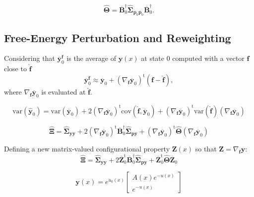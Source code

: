 \documentclass[aip,jcp,reprint,amsmath,amssymb]{revtex4-1}
\newcommand{\mt}[1]{\boldsymbol{\mathbf{#1}}}           %
\newcommand{\vt}[1]{\boldsymbol{\mathbf{#1}}}           %
\newcommand{\tr}[1]{#1^\text{t}}                        %
\begin{document}
\begin{equation}
\hat{\mt \Theta} = \overline{\mt B}_0^\dag \hat{\mt \Sigma}_{\overline{\vt p}_0 \overline{\vt p}_0} \overline{\mt B}_0^\dag.
\end{equation}

\subsection{Free-Energy Perturbation and Reweighting}

Considering that $\overline{\vt y}^{\vt f}_0$ is the average of $\vt y(x)$ at state $0$ computed with a vector $\vt f$ close to $\hat{\vt f}$
\begin{equation*}
\overline{\vt y}^{\vt f}_0 \approx \overline{\vt y}_0 + \tr{(\nabla_{\vt f}\overline{\vt y}_0)}({\vt f} - \hat{\vt f}),
\end{equation*}
where $\nabla_{\vt f}\overline{\vt y}_0$ is evaluated at $\hat{\vt f}$.

\begin{equation}
\text{var}(\hat{\vt y}_0) = \text{var}(\overline{\vt y}_0) + 2\tr{(\nabla_{\vt f}\overline{\vt y}_0)}\text{cov}(\hat{\vt f},\overline{\vt y}_0) + \tr{(\nabla_{\vt f}\overline{\vt y}_0)}\text{var}(\hat{\vt f})(\nabla_{\vt f}\overline{\vt y}_0)
\end{equation}


\begin{equation}
\hat{\mt \Xi} = \hat{\mt \Sigma}_{\vt y\vt y} + 2\tr{(\nabla_{\vt f}\overline{\vt y}_0)} \overline{\mt B}_0^\dag \hat{\mt \Sigma}_{\vt p\vt y} + \tr{(\nabla_{\vt f}\overline{\vt y}_0)}\hat{\mt \Theta}{(\nabla_{\vt f}\overline{\vt y}_0)}
\end{equation}

Defining a new matrix-valued configurational property $\mt Z(x)$ so that $\mt Z = \nabla_{\vt f}\vt y$:
\begin{equation}
\hat{\mt \Xi} = \hat{\mt \Sigma}_{\vt y\vt y} + 2\tr{\overline{\mt Z}_0} \overline{\mt B}_0^\dag \hat{\mt \Sigma}_{\vt p\vt y} + \tr{\overline{\mt Z}_0}\hat{\mt \Theta}{\overline{\mt Z}_0}
\end{equation}

\begin{equation}
{\vt y}(x) = e^{u_0(x)} \left[\begin{array}{c} A(x)e^{-u(x)} \\ e^{-u(x)} \end{array}\right]
\end{equation}
\end{document}
